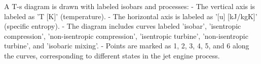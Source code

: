 A T-s diagram is drawn with labeled isobars and processes:  
- The vertical axis is labeled as 'T [K]' (temperature).  
- The horizontal axis is labeled as '[u] [kJ/kgK]' (specific entropy).  
- The diagram includes curves labeled 'isobar', 'isentropic compression', 'non-isentropic compression', 'isentropic turbine', 'non-isentropic turbine', and 'isobaric mixing'.  
- Points are marked as 1, 2, 3, 4, 5, and 6 along the curves, corresponding to different states in the jet engine process.